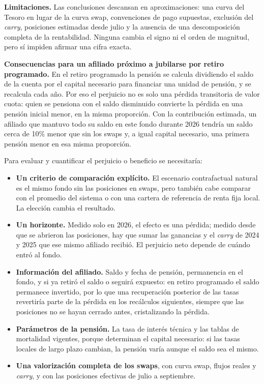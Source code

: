 \documentclass[11pt,letterpaper]{article}
\begin{document}
\textbf{Limitaciones.} Las conclusiones descansan en aproximaciones: una curva del
Tesoro en lugar de la curva swap, convenciones de pago supuestas, exclusión del
\emph{carry}, posiciones estimadas desde julio y la ausencia de una descomposición
completa de la rentabilidad. Ninguna cambia el signo ni el orden de magnitud, pero sí
impiden afirmar una cifra exacta.

\textbf{Consecuencias para un afiliado próximo a jubilarse por retiro programado.} En
el retiro programado la pensión se calcula dividiendo el saldo de la cuenta por el
capital necesario para financiar una unidad de pensión, y se recalcula cada año. Por
eso el perjuicio no es solo una pérdida transitoria de valor cuota: quien se pensiona
con el saldo disminuido convierte la pérdida en una pensión inicial menor, en la misma
proporción. Con la contribución estimada, un afiliado que mantuvo todo su saldo en este
fondo durante 2026 tendría un saldo cerca de 10\% menor que sin los swaps y, a igual
capital necesario, una primera pensión menor en esa misma proporción.

Para evaluar y cuantificar el perjuicio o beneficio se necesitaría:

\begin{itemize}[leftmargin=*]
\item \textbf{Un criterio de comparación explícito.} El escenario contrafactual natural
es el mismo fondo sin las posiciones en swaps, pero también cabe comparar con el
promedio del sistema o con una cartera de referencia de renta fija local. La elección
cambia el resultado.
\item \textbf{Un horizonte.} Medido solo en 2026, el efecto es una pérdida; medido
desde que se abrieron las posiciones, hay que sumar las ganancias y el \emph{carry} de
2024 y 2025 que ese mismo afiliado recibió. El perjuicio neto depende de cuándo entró
al fondo.
\item \textbf{Información del afiliado.} Saldo y fecha de pensión, permanencia en el
fondo, y si ya retiró el saldo o seguirá expuesto: en retiro programado el saldo
permanece invertido, por lo que una recuperación posterior de las tasas revertiría
parte de la pérdida en los recálculos siguientes, siempre que las posiciones no se
hayan cerrado antes, cristalizando la pérdida.
\item \textbf{Parámetros de la pensión.} La tasa de interés técnica y las tablas de
mortalidad vigentes, porque determinan el capital necesario: si las tasas locales de
largo plazo cambian, la pensión varía aunque el saldo sea el mismo.
\item \textbf{Una valorización completa de los swaps}, con curva swap, flujos reales y
\emph{carry}, y con las posiciones efectivas de julio a septiembre.
\end{itemize}
\end{document}
